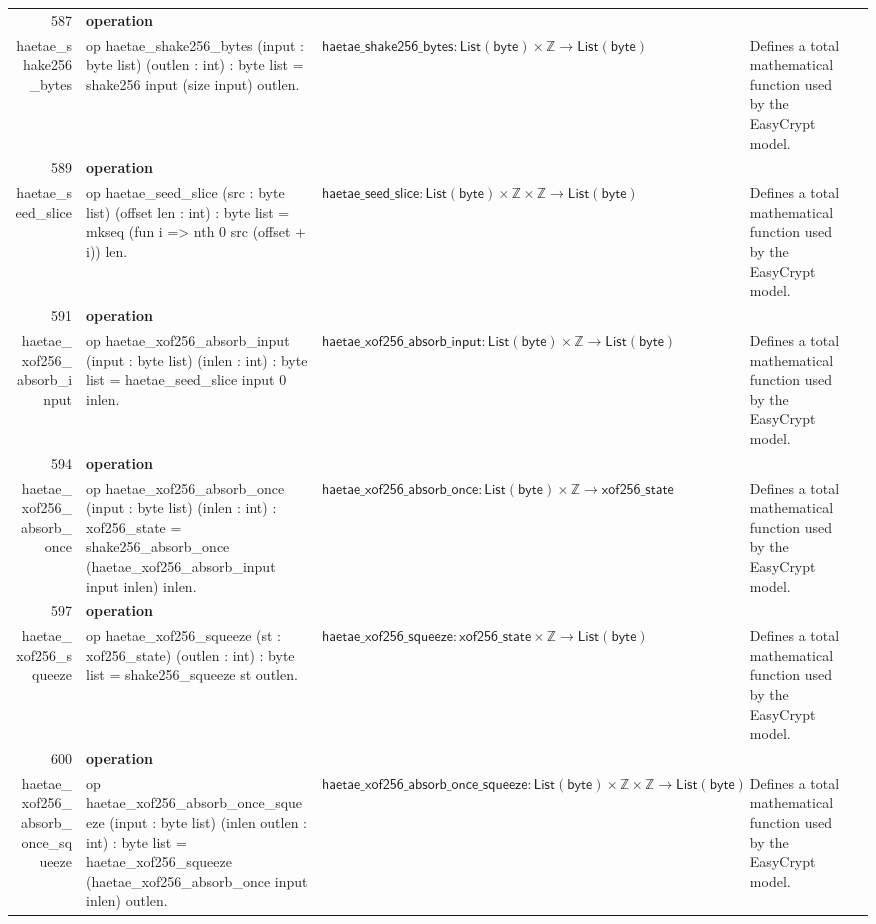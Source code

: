 \documentclass[10pt]{article}
\newcommand{\ec}[1]{\begingroup\ttfamily\scriptsize #1\endgroup}
\begin{document}
\begin{longtable}{r L{0.17\textwidth} L{0.26\textwidth} L{0.27\textwidth} L{0.20\textwidth}}
587 & \textbf{operation}\\\ec{haetae\_shake256\_bytes} & \ec{op haetae\_shake256\_bytes (input : byte list) (outlen : int) : byte list = shake256 input (size input) outlen.} & \(\mathsf{haetae\_shake256\_bytes} : \mathsf{List}(\mathsf{byte}) \times \mathbb{Z} \to \mathsf{List}(\mathsf{byte})\) & Defines a total mathematical function used by the EasyCrypt model. \\
589 & \textbf{operation}\\\ec{haetae\_seed\_slice} & \ec{op haetae\_seed\_slice (src : byte list) (offset len : int) : byte list = mkseq (fun i => nth 0 src (offset + i)) len.} & \(\mathsf{haetae\_seed\_slice} : \mathsf{List}(\mathsf{byte}) \times \mathbb{Z} \times \mathbb{Z} \to \mathsf{List}(\mathsf{byte})\) & Defines a total mathematical function used by the EasyCrypt model. \\
591 & \textbf{operation}\\\ec{haetae\_xof256\_absorb\_input} & \ec{op haetae\_xof256\_absorb\_input (input : byte list) (inlen : int) : byte list = haetae\_seed\_slice input 0 inlen.} & \(\mathsf{haetae\_xof256\_absorb\_input} : \mathsf{List}(\mathsf{byte}) \times \mathbb{Z} \to \mathsf{List}(\mathsf{byte})\) & Defines a total mathematical function used by the EasyCrypt model. \\
594 & \textbf{operation}\\\ec{haetae\_xof256\_absorb\_once} & \ec{op haetae\_xof256\_absorb\_once (input : byte list) (inlen : int) : xof256\_state = shake256\_absorb\_once (haetae\_xof256\_absorb\_input input inlen) inlen.} & \(\mathsf{haetae\_xof256\_absorb\_once} : \mathsf{List}(\mathsf{byte}) \times \mathbb{Z} \to \mathsf{xof256\_state}\) & Defines a total mathematical function used by the EasyCrypt model. \\
597 & \textbf{operation}\\\ec{haetae\_xof256\_squeeze} & \ec{op haetae\_xof256\_squeeze (st : xof256\_state) (outlen : int) : byte list = shake256\_squeeze st outlen.} & \(\mathsf{haetae\_xof256\_squeeze} : \mathsf{xof256\_state} \times \mathbb{Z} \to \mathsf{List}(\mathsf{byte})\) & Defines a total mathematical function used by the EasyCrypt model. \\
600 & \textbf{operation}\\\ec{haetae\_xof256\_absorb\_once\_squeeze} & \ec{op haetae\_xof256\_absorb\_once\_squeeze (input : byte list) (inlen outlen : int) : byte list = haetae\_xof256\_squeeze (haetae\_xof256\_absorb\_once input inlen) outlen.} & \(\mathsf{haetae\_xof256\_absorb\_once\_squeeze} : \mathsf{List}(\mathsf{byte}) \times \mathbb{Z} \times \mathbb{Z} \to \mathsf{List}(\mathsf{byte})\) & Defines a total mathematical function used by the EasyCrypt model. \\

\end{longtable}
\end{document}
